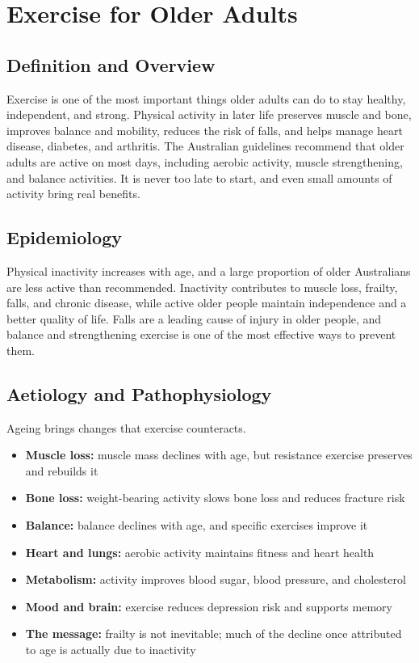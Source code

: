 \chapter{Exercise for Older Adults}

\section*{Definition and Overview}
Exercise is one of the most important things older adults can do to stay healthy, independent, and strong. Physical activity in later life preserves muscle and bone, improves balance and mobility, reduces the risk of falls, and helps manage heart disease, diabetes, and arthritis. The Australian guidelines recommend that older adults are active on most days, including aerobic activity, muscle strengthening, and balance activities. It is never too late to start, and even small amounts of activity bring real benefits.

\section*{Epidemiology}
Physical inactivity increases with age, and a large proportion of older Australians are less active than recommended. Inactivity contributes to muscle loss, frailty, falls, and chronic disease, while active older people maintain independence and a better quality of life. Falls are a leading cause of injury in older people, and balance and strengthening exercise is one of the most effective ways to prevent them.

\section*{Aetiology and Pathophysiology}
Ageing brings changes that exercise counteracts.
\begin{itemize}
    \item \textbf{Muscle loss:} muscle mass declines with age, but resistance exercise preserves and rebuilds it
    \item \textbf{Bone loss:} weight-bearing activity slows bone loss and reduces fracture risk
    \item \textbf{Balance:} balance declines with age, and specific exercises improve it
    \item \textbf{Heart and lungs:} aerobic activity maintains fitness and heart health
    \item \textbf{Metabolism:} activity improves blood sugar, blood pressure, and cholesterol
    \item \textbf{Mood and brain:} exercise reduces depression risk and supports memory
    \item \textbf{The message:} frailty is not inevitable; much of the decline once attributed to age is actually due to inactivity
\end{itemize}

